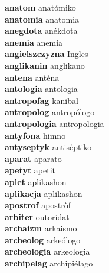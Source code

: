 \textbf{anatom } anatómiko \\
\textbf{anatomia } anatomia \\
\textbf{anegdota } anékdota \\
\textbf{anemia } anemia \\
\textbf{angielszczyzna } Ingles \\
\textbf{anglikanin } anglikano \\
\textbf{antena } antèna \\
\textbf{antologia } antologia \\
\textbf{antropofag } kanibal \\
\textbf{antropolog } antropólogo \\
\textbf{antropologia } antropologia \\
\textbf{antyfona } himno \\
\textbf{antyseptyk } antiséptiko \\
\textbf{aparat } aparato \\
\textbf{apetyt } apetit \\
\textbf{aplet } aplikashon \\
\textbf{aplikacja } aplikashon \\
\textbf{apostrof } apostròf \\
\textbf{arbiter } outoridat \\
\textbf{archaizm } arkaismo \\
\textbf{archeolog } arkeólogo \\
\textbf{archeologia } arkeologia \\
\textbf{archipelag } archipiélago \\
